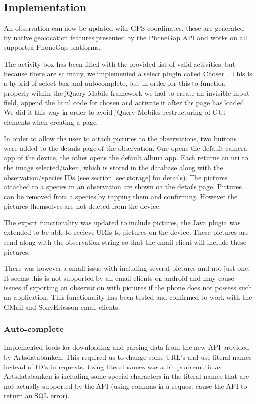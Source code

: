 \subsection{Implementation}
An observation can now be updated with GPS coordinates, these are generated by native geolocation features presented by the PhoneGap API and works on all supported PhoneGap platforms.

The activity box has been filled with the provided list of valid activities, but because there are so many, we implemented a select plugin called Chosen \cite{library:chosen}. This is a hybrid of select box and autocomplete, but in order for this to function properly within the jQuery Mobile framework we had to create an invisible input field, append the html code for chosen and activate it after the page has loaded. We did it this way in order to avoid jQuery Mobiles restructuring of GUI elements when creating a page.

In order to allow the user to attach pictures to the observations, two buttons were added to the details page of the observation. One opens the default camera app of the device, the other opens the default album app. Each returns an uri to the image selected/taken, which is stored in the database along with the observation/species IDs (see section \ref{sec:storage} for details). The pictures attached to a species in an observation are shown on the details page. Pictures can be removed from a species by tapping them and confirming. However the pictures themselves are not deleted from the device.

The export functionality was updated to include pictures, the Java plugin was extended to be able to recieve URIs to pictures on the device.
These pictures are send along with the observation string so that the email client will include these pictures.

There was however a small issue with including several pictures and not just one.
It seems this is not supported by all email clients on android and may cause issues if exporting an observation with pictures if the phone does not possess such an application.
This functionality has been tested and confirmed to work with the GMail and SonyEricsson email clients.

	\subsubsection{Auto-complete}

	Implemented tools for downloading and parsing data from the new API
	provided by Artsdatabanken. This required us to change some URL's and use
	literal names instead of ID's in requests. Using literal names was a bit
	problematic as Artsdatabanken is including some special characters in the
	literal names that are not actually supported by the API (using commas in a
	request cause the API to return an SQL error).

